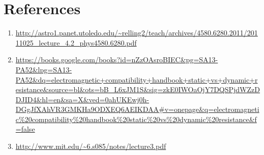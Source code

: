 \documentclass{article}
\begin{document}
	\section{References}
	\begin{enumerate}
		\item \label{itm:resistivity_simplification} \url{http://astro1.panet.utoledo.edu/~relling2/teach/archives/4580.6280.2011/20111025_lecture_4.2_phys4580.6280.pdf}
		\item \label{itm:electromagnetic_compatibility} \url{https://books.google.com/books?id=nZzOAsroBIEC&pg=SA13-PA52&lpg=SA13-PA52&dq=electromagnetic+compatibility+handbook+static+vs+dynamic+resistance&source=bl&ots=bB_L6xJM1S&sig=zkE0IWOaOjY7DQSPjdWZzDDJID4&hl=en&sa=X&ved=0ahUKEwj0h-DGgJfXAhVR3GMKHa9ODXEQ6AEIKDAA#v=onepage&q=electromagnetic\%20compatibility\%20handbook\%20static\%20vs\%20dynamic\%20resistance&f=false}
		\item \label{itm:best_fit_line} \url{http://www.mit.edu/~6.s085/notes/lecture3.pdf}
	\end{enumerate}
\end{document}
